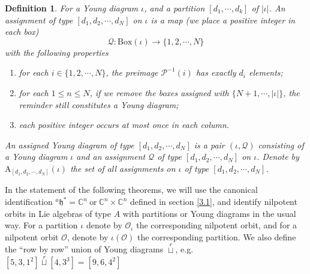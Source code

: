 \documentclass[12pt, a4paper]{amsart}
\numberwithin{equation}{section}
\newtheorem{defn}[thm]{Definition}
\newcommand{\BC}{{\mathbb {C}}}
\newcommand{\CO}{{\mathcal {O}}}
\newcommand{\CP}{{\mathcal {P}}}
\newcommand{\CQ}{{\mathcal {Q}}}
\newcommand{\RA}{{\mathrm {A}}}
\newcommand{\fh}{\mathfrak{h}}
\begin{document}
\begin{defn}
   For a Young diagram $\iota$, and a partition $[d_1, \cdots, d_k]$ of $|\iota|$.  An assignment of type $[d_1,d_2, \cdots, d_N]$ on $\iota$ is a map (we place a positive integer in each box)
   $$\CQ: \mathrm{Box}(\iota) \to \{1,2, \cdots,N\} $$
   with the following properties

   \begin{enumerate}
      \item for each $i \in \{1,2,\cdots,N\}$, the preimage $\CP^{-1}(i)$ has exactly $d_i$ elements;
      \item for each $1 \leq n \leq N$, if we remove the boxes assigned with $\{N+1, \cdots, |\iota|\}$, the reminder still constitutes a Young diagram;
      \item each positive integer occurs at most once in each column.
   \end{enumerate}
   An assigned Young diagram of type $[d_1,d_2, \cdots, d_N]$ is a pair $(\iota,\CQ)$ consisting of a Young diagram $\iota$ and an assignment $\CQ$ of type $[d_1,d_2, \cdots, d_N]$ on $\iota$. Denote by $\RA_{[d_1,d_2,\cdots,d_N]}(\iota)$ the set of all assignments on $\iota$ of type $[d_1,d_2,\cdots,d_N]$.
\end{defn}




In the statement of the following theorems, we will use the canonical identification $^{a}\fh^* = \BC^n \ \textrm{or} \ \BC^n \times \BC^n$ defined in section \ref{3.1}, and identify nilpotent orbits in Lie algebras of type $A$ with partitions or Young diagrams in the usual way. For a partition $\iota$ denote by $\CO_\iota$ the corresponding nilpotent orbit, and for a nilpotent orbit $\CO$, denote by $\iota(\CO)$ the corresponding partition. We also define the ``row by row” union of Young diagrams $\mathop{\sqcup}\limits^r$, e.g. $[5,3,1^2] \mathop{\sqcup}\limits^r [4,3^3] = [9,6,4^2]$
\end{document}
